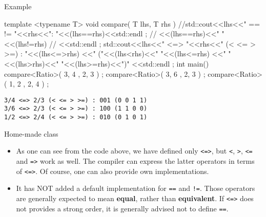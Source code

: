\begin{frame}[fragile]
  \scriptsize
  \begin{exampleblock}{Example}
    \begin{cppcode*}{}
    template <typename T>
    void compare( T lhs, T rhs )
    {
      //std::cout<<lhs<<" == != "<<rhs<<": "<<(lhs==rhs)<<std::endl ;
      //  <<(lhs==rhs)<<" "<<(lhs!=rhs)
      //  <<std::endl ;
      std::cout<<lhs<<" <=> "<<rhs<<" (< <= > >=) : "<<(lhs<=>rhs)
        <<" ("<<(lhs<rhs)<<" "<<(lhs<=rhs)
        <<" "<<(lhs>rhs)<<" "<<(lhs>=rhs)<<")"
        <<std::endl ;
    }
    int main()
    {
      compare<Ratio>({ 3, 4 },{ 2, 3 }) ;
      compare<Ratio>({ 3, 6 },{ 2, 3 }) ;
      compare<Ratio>({ 1, 2 },{ 2, 4 }) ;
    }
     \end{cppcode*}
  \end{exampleblock}
  \begin{Verbatim}
3/4 <=> 2/3 (< <= > >=) : 001 (0 0 1 1)
3/6 <=> 2/3 (< <= > >=) : 100 (1 1 0 0)
1/2 <=> 2/4 (< <= > >=) : 010 (0 1 0 1)
  \end{Verbatim}
\end{frame}

\begin{frame}[fragile]
  \begin{block}{Home-made class}
    \begin{itemize}
      \item As one can see from the code above, we have defined only \texttt{<=>}, but \texttt{<}, \texttt{>}, \texttt{<=} and \texttt{=>} work as well. The compiler can express the latter operators in terms of \texttt{<=>}. Of course, one can also provide own implementations.
      \item It has NOT added a default implementation for \texttt{==} and \texttt{!=}. Those operators are generally expected to mean \textbf{equal}, rather than \textbf{equivalent}. If \texttt{<=>} does not provides a strong order, it is generally advised not to define \texttt{==}.
    \end{itemize}
  \end{block}
\end{frame}

